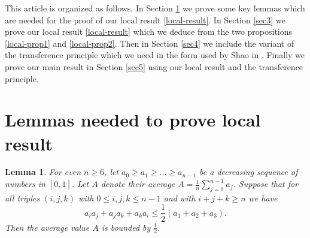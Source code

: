 \documentclass[a4paper,11pt,twoside]{amsart}
\newtheorem{lemma}[theorem]{Lemma}
\theoremstyle{definition}
\numberwithin{equation}{section}
\begin{document}
This article is organized as follows. In Section \ref{sec2} we prove some key lemmas which are needed for the proof of our local result \ref{local-result}. In Section \ref{sec3} we prove our local result \ref{local-result} which we deduce from the two propositions \ref{local-prop1} and \ref{local-prop2}. Then in Section \ref{sec4} we include the variant of the transference principle which we need in the form used by Shao in \cite{Shao}. Finally we prove our main result in Section \ref{sec5} using our local result and the transference principle.

\section{Lemmas needed to prove local result}\label{sec2}


\begin{lemma}\label{symmetric-lemma}
For even $n \geq 6$, let $a_0 \geq a_1 \geq \dots \geq a_{n-1}$ be a decreasing sequence of numbers in $[0,1]$. Let $A$ denote their average $A = \frac{1}{n}\sum_{j=0}^{n-1}a_j$. Suppose that for all triples $(i,j,k)$ with $0 \leq i,j,k \leq n-1$ and with $i + j + k \geq n$ we have $$a_ia_j + a_ja_k + a_ka_i \leq \frac{1}{2}(a_1 + a_2 + a_3).$$ Then the average value $A$ is bounded by $\frac{1}{2}.$
\end{lemma}
\end{document}
